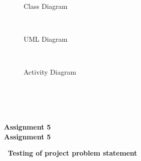 \begin{enumerate}
\begin{enumerate}
\begin{enumerate}
\\
\begin{figure}[h]
\centerline{}
\label{atcres}
\caption{Class Diagram}
\end{figure}
\\

\begin{figure}[h]
\centerline{}
\label{atcres}
\caption{UML Diagram}
\end{figure}
\\

\begin{figure}[h]
\centerline{}
\label{atcres}
\caption{Activity Diagram}
\end{figure}

\end{enumerate}
\end{enumerate}
\\
\\
\vspace*{5in}
\pagebreak
\\
\vspace*{6in}
\\
\hspace*{2.125 in}\textbf{\large Assignment 5}\\
\hspace*{2.125 in}\textbf{\large Assignment 5}\\
\begin{flushleft}
\textbf{\ Testing of project problem statement}\\
\end{flushleft}


\end{enumerate}
